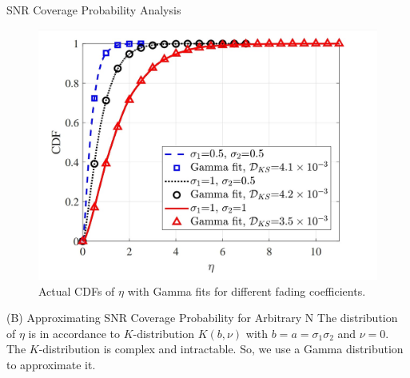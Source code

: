 \documentclass{beamer}
\begin{document}
\begin{frame}{SNR Coverage Probability Analysis}
    \begin{block}{}
        \begin{figure}
            \centering
            \includegraphics[scale=0.15]{figures/cdf_with_gamma_fit.jpg}
            \small{\caption{Actual CDFs of $\eta$ with Gamma fits for different fading coefficients.}}
            \label{fig:actual_cdf}
        \end{figure}
    \end{block}
    \begin{block}{(B) Approximating SNR Coverage Probability for Arbitrary N}
        The distribution of $\eta$ is in accordance to $K$-distribution $K(b, \nu)$ with $b = a = \sigma_1\sigma_2$ and $\nu = 0$. The $K$-distribution is complex and intractable. So, we use a Gamma distribution to approximate it.
    \end{block}
\end{frame}
\end{document}

